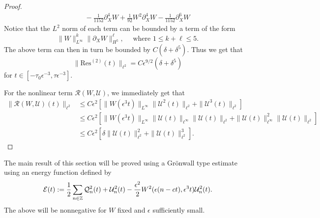 \begin{proof}
\begin{equation}
\begin{aligned}
		&\qquad- \frac 1 {1152} \partial_X^ 4 W + \frac 1 {92} W^2 \partial_X^ 4 W - \frac 1 {1152} \partial_X^ 6 W
	\end{aligned}
	\end{equation}
	Notice that the \(L^2\) norm of each term can be bounded by a term of the form
	\begin{equation}
		\| W \|_{L^\infty}^k \| \partial_X W \|_{H^5}^\ell, \quad \text{ where } 1\leq k+\ell \leq 5.
	\end{equation}
	The above term can then in turn be bounded by \(C(\delta + \delta^5)\). Thus we get that 
	\begin{equation}
		\|\mathrm{Res}^{(2)}(t)\|_{\ell^2} = C\epsilon^{9/2} \left(\delta + \delta^5 \right)
	\end{equation}
	for \(t\in [-\tau_0\epsilon^{-3}, \tau\epsilon^{-3}]\).
	
	For the nonlinear term \(\mathcal R(W,\mathcal U)\), we immediately get that
	\begin{equation}
	\begin{aligned}
		\|\mathcal R(W,\mathcal U)(t) \|_{\ell^2} &\leq C \epsilon^2 \left[ \|W(\epsilon^3t)\|_{L^\infty} \|\mathcal U^2(t) \|_{\ell^2}  + \| \mathcal U^3(t) \|_{\ell^2} \right] \\
		&\leq C\epsilon^2\left[ \|W(\epsilon^3 t)\|_{L^\infty}  \|\mathcal U(t)\|_{\ell^\infty} \|\mathcal U(t)\|_{\ell^2} + \|\mathcal U(t)\|_{\ell^\infty}^2 \|\mathcal{U}(t)\|_{\ell^2}\right] \\
		&\leq C \epsilon^2 \left[ \delta \|\mathcal U(t) \|_{\ell^2}^2 + \|\mathcal U(t)\|_{\ell^2}^3\right].
	\end{aligned}
	\end{equation}
\end{proof}

The main result of this section will be proved using a Gr\"onwall type estimate using an energy function defined by 
\begin{equation}\label{energy-function}
	\mathcal E(t) := \frac 1 2 \sum_{n\in\mathbb{Z}} \mathcal Q_n^2(t) + \mathcal U_n^2(t) - \frac{\epsilon^2} 2 W^2(\epsilon(n-ct),\epsilon^3t)\mathcal U_n^2(t).
\end{equation}
The above will be nonnegative for \(W\) fixed and \(\epsilon \) sufficiently small.

